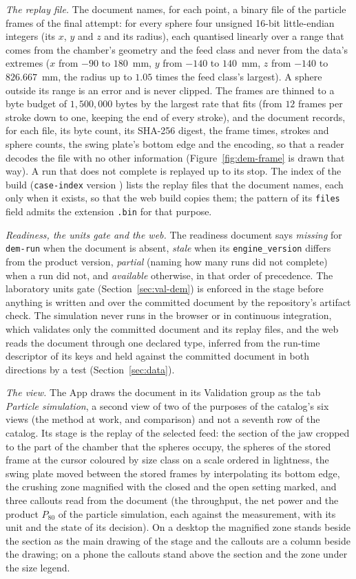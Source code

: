 \emph{The replay file.} The document names, for each point, a binary file of the particle frames of the final attempt: for every sphere four unsigned 16-bit little-endian integers (its $x$, $y$ and $z$ and its radius), each quantised linearly over a range that comes from the chamber's geometry and the feed class and never from the data's extremes ($x$ from $-90$ to $180$~mm, $y$ from $-140$ to $140$~mm, $z$ from $-140$ to $826.667$~mm, the radius up to $1.05$ times the feed class's largest). A sphere outside its range is an error and is never clipped. The frames are thinned to a byte budget of $1{,}500{,}000$ bytes by the largest rate that fits (from $12$ frames per stroke down to one, keeping the end of every stroke), and the document records, for each file, its byte count, its SHA-256 digest, the frame times, strokes and sphere counts, the swing plate's bottom edge and the encoding, so that a reader decodes the file with no other information (Figure~\ref{fig:dem-frame} is drawn that way). A run that does not complete is replayed up to its stop. The index of the build (\texttt{case-index} version ) lists the replay files that the document names, each only when it exists, so that the web build copies them; the pattern of its \texttt{files} field admits the extension \texttt{.bin} for that purpose.

\emph{Readiness, the units gate and the web.} The readiness document says \emph{missing} for \texttt{dem-run} when the document is absent, \emph{stale} when its \texttt{engine\_version} differs from the product version, \emph{partial} (naming how many runs did not complete) when a run did not, and \emph{available} otherwise, in that order of precedence. The laboratory units gate (Section~\ref{sec:val-dem}) is enforced in the stage before anything is written and over the committed document by the repository's artifact check. The simulation never runs in the browser or in continuous integration, which validates only the committed document and its replay files, and the web reads the document through one declared type, inferred from the run-time descriptor of its keys and held against the committed document in both directions by a test (Section~\ref{sec:data}).

\emph{The view.} The App draws the document in its Validation group as the tab \emph{Particle simulation}, a second view of two of the purposes of the catalog's six views (the method at work, and comparison) and not a seventh row of the catalog. Its stage is the replay of the selected feed: the section of the jaw cropped to the part of the chamber that the spheres occupy, the spheres of the stored frame at the cursor coloured by size class on a scale ordered in lightness, the swing plate moved between the stored frames by interpolating its bottom edge, the crushing zone magnified with the closed and the open setting marked, and three callouts read from the document (the throughput, the net power and the product $P_{80}$ of the particle simulation, each against the measurement, with its unit and the state of its decision). On a desktop the magnified zone stands beside the section as the main drawing of the stage and the callouts are a column beside the drawing; on a phone the callouts stand above the section and the zone under the size legend.

